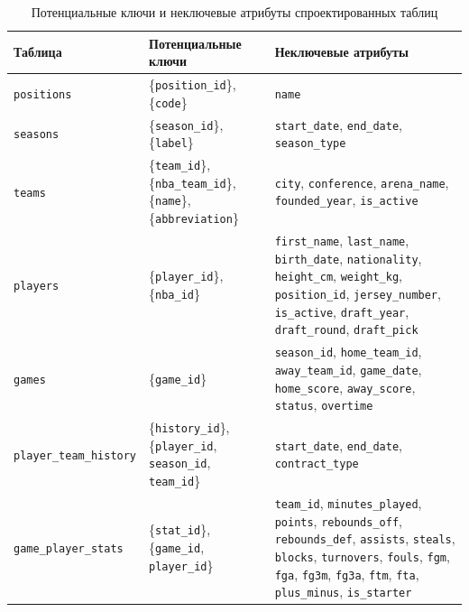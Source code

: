 {\footnotesize\setlength{\tabcolsep}{4pt}\renewcommand{\arraystretch}{1.15}
\begin{table}[H]
\caption{Потенциальные ключи и неключевые атрибуты спроектированных таблиц}
\label{tab:potential_keys}
\centering
\begin{tabular}{|>{\RaggedRight\arraybackslash}p{}|>{\RaggedRight\arraybackslash}p{}|>{\RaggedRight\arraybackslash}p{}|}
\hline
\textbf{Таблица} & \textbf{Потенциальные ключи} & \textbf{Неключевые атрибуты} \\
\hline
\texttt{positions} & \{\texttt{position\_id}\}, \{\texttt{code}\} & \texttt{name} \\
\hline
\texttt{seasons} & \{\texttt{season\_id}\}, \{\texttt{label}\} & \texttt{start\_date}, \texttt{end\_date}, \texttt{season\_type} \\
\hline
\texttt{teams} & \{\texttt{team\_id}\}, \{\texttt{nba\_team\_id}\}, \{\texttt{name}\}, \{\texttt{abbreviation}\} & \texttt{city}, \texttt{conference}, \texttt{arena\_name}, \texttt{founded\_year}, \texttt{is\_active} \\
\hline
\texttt{players} & \{\texttt{player\_id}\}, \{\texttt{nba\_id}\} & \texttt{first\_name}, \texttt{last\_name}, \texttt{birth\_date}, \texttt{nationality}, \texttt{height\_cm}, \texttt{weight\_kg}, \texttt{position\_id}, \texttt{jersey\_number}, \texttt{is\_active}, \texttt{draft\_year}, \texttt{draft\_round}, \texttt{draft\_pick} \\
\hline
\texttt{games} & \{\texttt{game\_id}\} & \texttt{season\_id}, \texttt{home\_team\_id}, \texttt{away\_team\_id}, \texttt{game\_date}, \texttt{home\_score}, \texttt{away\_score}, \texttt{status}, \texttt{overtime} \\
\hline
\texttt{player\_team\_history} & \{\texttt{history\_id}\}, \{\texttt{player\_id}, \texttt{season\_id}, \texttt{team\_id}\} & \texttt{start\_date}, \texttt{end\_date}, \texttt{contract\_type} \\
\hline
\texttt{game\_player\_stats} & \{\texttt{stat\_id}\}, \{\texttt{game\_id}, \texttt{player\_id}\} & \texttt{team\_id}, \texttt{minutes\_played}, \texttt{points}, \texttt{rebounds\_off}, \texttt{rebounds\_def}, \texttt{assists}, \texttt{steals}, \texttt{blocks}, \texttt{turnovers}, \texttt{fouls}, \texttt{fgm}, \texttt{fga}, \texttt{fg3m}, \texttt{fg3a}, \texttt{ftm}, \texttt{fta}, \texttt{plus\_minus}, \texttt{is\_starter} \\
\hline
\end{tabular}
\end{table}}


